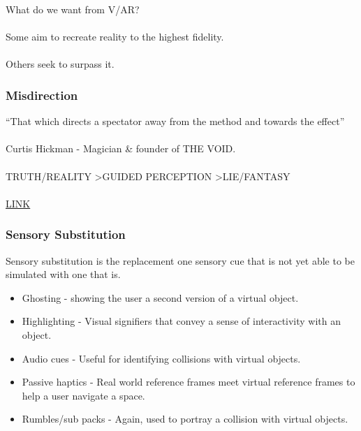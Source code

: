 \begin{frame}
	What do we want from V/AR? \\~\\
	Some aim to recreate reality to the highest fidelity. \\~\\
	Others seek to surpass it.
\end{frame}


\begin{frame}
	\frametitle{Misdirection}
	``That which directs a spectator away from the method and towards the effect'' \\~\\
	Curtis Hickman - Magician \& founder of THE VOID. \\~\\
	TRUTH/REALITY \textgreater  GUIDED PERCEPTION \textgreater  LIE/FANTASY \\~\\
	\href{https://www.youtube.com/watch?v=Ebwtq1HZJ2A}{LINK}
\end{frame}


\begin{frame}
	\frametitle{Sensory Substitution}
	Sensory substitution is the replacement one sensory cue that is not yet able to be simulated with one that is. 
	\begin{itemize}
		\item Ghosting - showing the user a second version of a virtual object. 
		\item Highlighting - Visual signifiers that convey a sense of interactivity with an object.
		\item Audio cues - Useful for identifying collisions with virtual objects.  
		\item Passive haptics - Real world reference frames meet virtual reference frames to help a user navigate a space. 
		\item Rumbles/sub packs - Again, used to portray a collision with virtual objects. 
	\end{itemize}
\end{frame}
	
